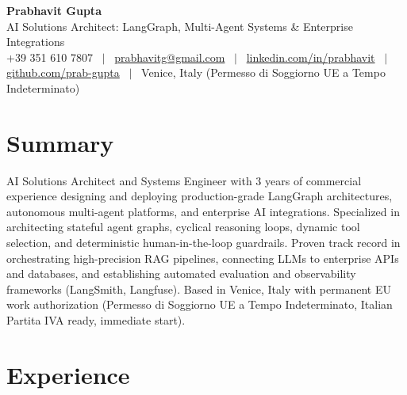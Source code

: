\documentclass[a4paper,10pt]{article}
\begin{document}
\begin{minipage}[c]{0.80\textwidth}
  {\Huge\bfseries Prabhavit Gupta}\\[3pt]
  {\color{accent}\large AI Solutions Architect: LangGraph, Multi-Agent Systems \& Enterprise Integrations}\\[6pt]
  {\footnotesize +39 351 610 7807 ~$\vert$~
  \href{mailto:prabhavitg@gmail.com}{prabhavitg@gmail.com} ~$\vert$~
  \href{https://www.linkedin.com/in/prabhavit/}{linkedin.com/in/prabhavit} ~$\vert$~
  \href{https://github.com/prab-gupta}{github.com/prab-gupta} ~$\vert$~
  Venice, Italy (Permesso di Soggiorno UE a Tempo Indeterminato)}
\end{minipage}\hfill

\section{Summary}
AI Solutions Architect and Systems Engineer with 3 years of commercial experience designing and deploying production-grade LangGraph architectures, autonomous multi-agent platforms, and enterprise AI integrations. Specialized in architecting stateful agent graphs, cyclical reasoning loops, dynamic tool selection, and deterministic human-in-the-loop guardrails. Proven track record in orchestrating high-precision RAG pipelines, connecting LLMs to enterprise APIs and databases, and establishing automated evaluation and observability frameworks (LangSmith, Langfuse). Based in Venice, Italy with permanent EU work authorization (Permesso di Soggiorno UE a Tempo Indeterminato, Italian Partita IVA ready, immediate start).

\section{Experience}
\end{document}
